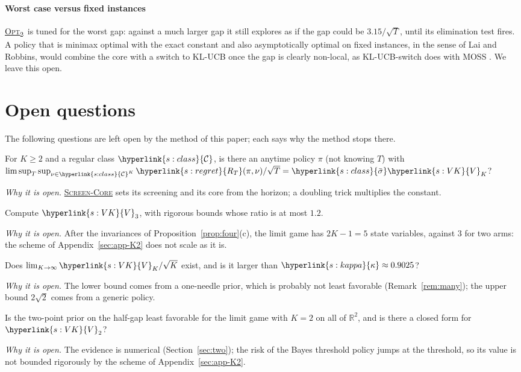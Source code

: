 \documentclass[11pt]{article}
\DeclareRobustCommand{\sy}[2]{{\hyperlink{#1}{#2}}}
\newcommand{\R}{\mathbb{R}}
\newcommand{\1}{\mathbf{1}}
\newcommand{\RT}{\sy{s:regret}{R_T}}
\newcommand{\Cl}{\sy{s:class}{\mathcal C}}
\newcommand{\sbar}{\sy{s:class}{\bar\sigma}}
\newcommand{\VK}{\sy{s:VK}{V}}
\newcommand{\kap}{\sy{s:kappa}{\kappa}}
\newcommand{\SC}{\sy{alg:sc}{\textsc{Screen-Core}}}
\newcommand{\OPT}{\sy{alg:opt}{\textsc{Opt}\textsubscript{2}}}
\begin{document}
\paragraph{Worst case versus fixed instances} \OPT\ is tuned for the worst gap: against a much larger gap it still explores as if the gap could be $3.15/\sqrt T$,
until its elimination test fires. A policy that is minimax optimal with the exact constant and also asymptotically optimal on fixed instances, in the sense of Lai and
Robbins, would combine the core with a switch to KL-UCB once the gap is clearly non-local, as KL-UCB-switch does with MOSS \citep{GHMS22}. We leave this open.

\section{Open questions}\label{sec:open}

The following questions are left open by the method of this paper; each says why the method stops there.

\begin{openquestion}\label{oq:anytime}
For $K\ge2$ and a regular class $\Cl$, is there an anytime policy $\pi$ (not knowing $T$) with
$\limsup_T\sup_{\nu\in\Cl^K}\RT(\pi,\nu)/\sqrt T=\sbar\VK_K$?
\end{openquestion}
\noindent\emph{Why it is open.} \SC{} sets its screening and its core from the horizon; a doubling trick multiplies the
constant.

\begin{openquestion}\label{oq:V3}
Compute $\VK_3$, with rigorous bounds whose ratio is at most $1.2$.
\end{openquestion}
\noindent\emph{Why it is open.} After the invariances of Proposition~\ref{prop:four}(c), the limit game has $2K-1=5$
state variables, against $3$ for two arms: the scheme of Appendix~\ref{sec:app-K2} does not scale as it is.

\begin{openquestion}\label{oq:many}
Does $\lim_{K\to\infty}\VK_K/\sqrt K$ exist, and is it larger than $\kap\approx0.9025$?
\end{openquestion}
\noindent\emph{Why it is open.} The lower bound comes from a one-needle prior, which is probably not least favorable
(Remark~\ref{rem:many}); the upper bound $2\sqrt2$ comes from a generic policy.

\begin{openquestion}\label{oq:V2}
Is the two-point prior on the half-gap least favorable for the limit game with $K=2$ on all of $\R^2$, and is there a
closed form for $\VK_2$?
\end{openquestion}
\noindent\emph{Why it is open.} The evidence is numerical (Section~\ref{sec:two}); the risk of the Bayes threshold policy
jumps at the threshold, so its value is not bounded rigorously by the scheme of Appendix~\ref{sec:app-K2}.
\end{document}
